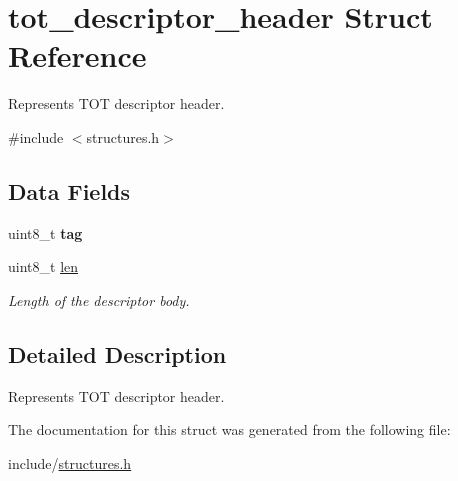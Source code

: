 \hypertarget{structtot__descriptor__header}{}\section{tot\+\_\+descriptor\+\_\+header Struct Reference}
\label{structtot__descriptor__header}


Represents T\+OT descriptor header.  




{\ttfamily \#include $<$structures.\+h$>$}

\subsection*{Data Fields}
\begin{DoxyCompactItemize}
\item 
uint8\+\_\+t {\bfseries tag}\hypertarget{structtot__descriptor__header_a582e1a3735d0ef8297cddc97e954c935}{}\label{structtot__descriptor__header_a582e1a3735d0ef8297cddc97e954c935}

\item 
uint8\+\_\+t \hyperlink{structtot__descriptor__header_ab6a192f014bf34fa28c53a5622465526}{len}\hypertarget{structtot__descriptor__header_ab6a192f014bf34fa28c53a5622465526}{}\label{structtot__descriptor__header_ab6a192f014bf34fa28c53a5622465526}

\begin{DoxyCompactList}\small\item\em Length of the descriptor body. \end{DoxyCompactList}\end{DoxyCompactItemize}


\subsection{Detailed Description}
Represents T\+OT descriptor header. 

The documentation for this struct was generated from the following file\+:\begin{DoxyCompactItemize}
\item 
include/\hyperlink{structures_8h}{structures.\+h}\end{DoxyCompactItemize}

